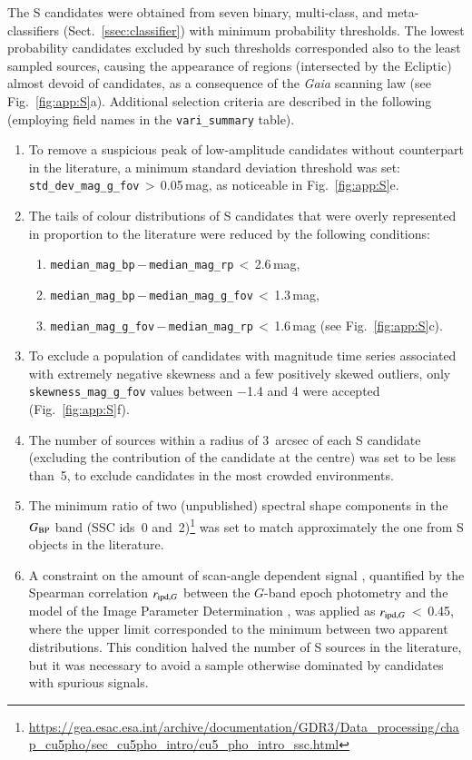 \documentclass[longauth]{aa}
\def\gaia{\textit{Gaia}\xspace}
\def\gdr3{\textit{Gaia}~DR3\xspace}
\def\g{$G$\xspace}
\def\bp{$G_{\rm BP}$\xspace}
\begin{document}
The S candidates were obtained from seven binary, multi-class, and meta-classifiers (Sect.~\ref{ssec:classifier}) with minimum probability thresholds. The lowest probability candidates excluded by such thresholds corresponded also to the least sampled sources, causing the appearance of regions (intersected by the Ecliptic) almost devoid of candidates,  as a consequence of the \gaia scanning law (see Fig.~\ref{fig:app:S}a).
Additional selection criteria are described in the following (employing field names in the \texttt{vari\_summary} table).
\begin{enumerate}
    \item To remove a suspicious peak of low-amplitude candidates without counterpart in the literature, a minimum standard deviation threshold was set: \texttt{std\_dev\_mag\_g\_fov}\,$>$\,0.05\,mag, as noticeable in Fig.~\ref{fig:app:S}e.
    \item The tails of colour distributions of S candidates that were overly represented in proportion to the literature were reduced by the following conditions: 
    \begin{enumerate}
     \item \texttt{median\_mag\_bp}\,$-$\,\texttt{median\_mag\_rp}\,$<$\,2.6\,mag,
     \item \texttt{median\_mag\_bp}\,$-$\,\texttt{median\_mag\_g\_fov}\,$<$\,1.3\,mag,
     \item \texttt{median\_mag\_g\_fov}\,$-$\,\texttt{median\_mag\_rp}\,$<$\,1.6\,mag (see Fig.~\ref{fig:app:S}c).
    \end{enumerate} 
    \item To exclude a population of candidates with magnitude time series associated with extremely negative skewness and a few positively skewed outliers, only \texttt{skewness\_mag\_g\_fov} values between $-$1.4 and 4 were accepted (Fig.~\ref{fig:app:S}f). 
    \item The number of sources within a radius of 3~arcsec of each S candidate (excluding the contribution of the candidate at the centre) was set to be less than~5, to exclude candidates in the most crowded environments.
    \item The minimum ratio of two (unpublished) spectral shape components in the \bp band (SSC ids~0 and~2)\footnote{\url{https://gea.esac.esa.int/archive/documentation/GDR3/Data_processing/chap_cu5pho/sec_cu5pho_intro/cu5_pho_intro_ssc.html}\label{foot:ssc}} was set to match approximately the one from S objects in the literature. 
    \item A constraint on the amount of scan-angle dependent signal \citep{DR3-DPACP-164}, quantified by the Spearman correlation $r_{{\rm ipd},G}$ between the \g-band epoch photometry and the model of the Image Parameter Determination \citep[IPD; see sect.~3.3.6 of the \gdr3 documentation in][]{2022gdr3.reptE...3C}, was applied as $r_{{\rm ipd},G}$\,$<$\,0.45, where the upper limit corresponded to the minimum between two apparent distributions.  This condition halved the number of S sources in the literature, but it was necessary to avoid a sample otherwise dominated by candidates with spurious signals.
\end{enumerate}
\end{document}
